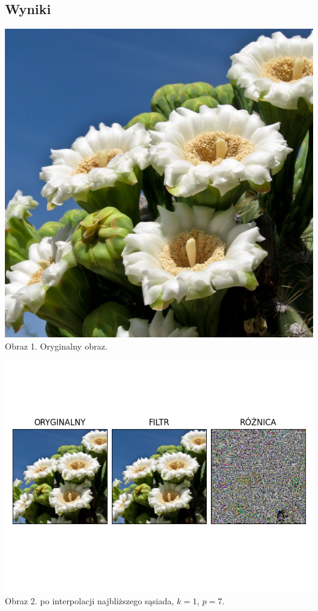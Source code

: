 \documentclass[14pt]{article}
\begin{document}
\subsection{Wyniki}
\vspace{1cm}
\begin{center}
    \includegraphics[scale=0.15]{images/cactus.jpg}
    \\ \small Obraz 1. Oryginalny obraz.

    \includegraphics[scale=0.7]{images/nn_k1_p7.png}
    \\ \small Obraz 2. po interpolacji najbliższego sąsiada, 
    $k=1$, $p=7$.


\end{center}
\end{document}
